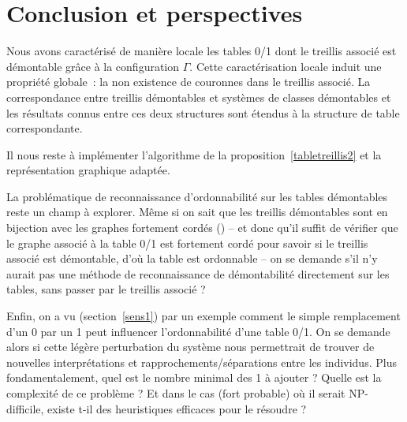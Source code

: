 \documentclass[a4paper]{report}
\begin{document}
\chapter*{Conclusion et perspectives}

\label{sccl}

Nous avons caractérisé de manière locale les tables 0/1 dont le treillis associé est démontable grâce à la configuration $\Gamma$.
Cette caractérisation locale induit une propriété globale~: la non existence de couronnes dans le treillis associé.
La correspondance entre treillis démontables et systèmes de classes démontables et les résultats connus entre ces deux structures sont 
étendus à la structure de table correspondante.

Il nous reste à implémenter l'algorithme de la proposition~\ref{tabletreillis2} et la représenta\-tion graphique adaptée.

La problématique de reconnaissance d'ordonnabilité sur les tables démonta\-bles reste un champ à explorer. Même si on sait que les treillis démonta\-bles sont en bijection avec les graphes 
fortement cordés (\cite{crow_free}) -- et donc qu'il suffit de vérifier que le graphe associé à la table 0/1 est fortement cordé pour savoir si le treillis associé 
est démontable, d'où la table est ordonnable -- on se demande s'il n'y aurait pas une méthode de reconnaissance de démontabilité directement sur les tables, 
sans passer par le treillis associé ?

Enfin, on a vu (section~\ref{sens1}) par un exemple comment le simple remplacement d'un 0 par un 1 peut influencer l'ordonnabilité d'une table 0/1. On se demande alors 
si cette légère perturbation du système nous permettrait de trouver de nouvelles interprétations et rapprochements/séparations entre les individus. Plus fondamentalement, quel est le
 nombre minimal des 1 à ajouter ? Quelle est la complexité de ce problème ? Et dans le cas (fort probable) où il serait NP-difficile, existe t-il des heuristiques efficaces pour le résoudre ?  
\end{document}
